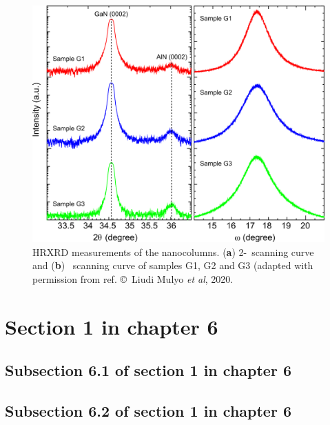 \begin{figure} %
    \centering
    \includegraphics[width=\textwidth]{figures/paper-iv/fig-6.png}
    \caption[HRXRD measurements of the nanocolumns]{HRXRD measurements of the nanocolumns. (\textbf{a}) 2\straighttheta-\textomega \ scanning curve and (\textbf{b}) \textomega \ scanning curve of samples G1, G2 and G3 (adapted with permission from ref.  \copyright \ Liudi Mulyo \textit{et al}, 2020.}
    \label{fig:figures/paper-iv/fig-6}
\end{figure}

\section{Section 1 in chapter 6}
\lipsum[2-4]

\subsection{Subsection 6.1 of section 1 in chapter 6}
\lipsum[5-7]

\subsection{Subsection 6.2 of section 1 in chapter 6}
\lipsum[8-11]

